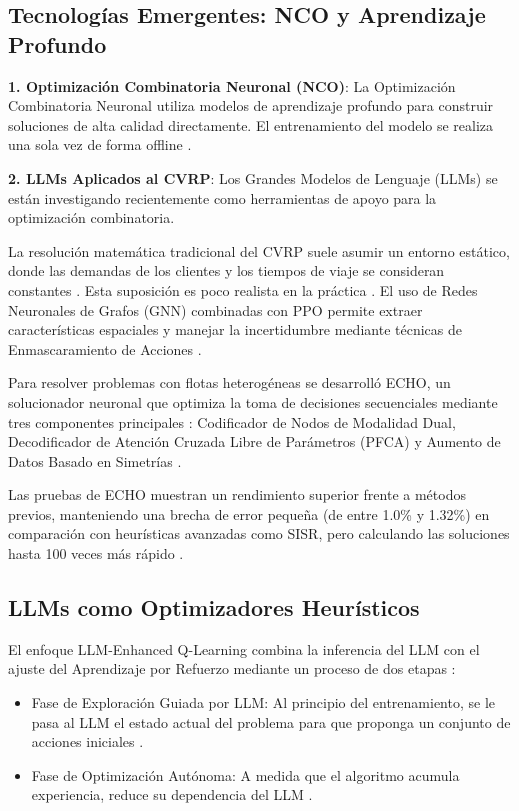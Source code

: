 \documentclass[a4paper, 11pt]{article}
\begin{document}
\subsection{Tecnologías Emergentes: NCO y Aprendizaje Profundo}

\textbf{1. Optimización Combinatoria Neuronal (NCO)}: La Optimización Combinatoria Neuronal utiliza modelos de aprendizaje profundo para construir soluciones de alta calidad directamente. El entrenamiento del modelo se realiza una sola vez de forma offline \cite{ref8}.

\textbf{2. LLMs Aplicados al CVRP}: Los Grandes Modelos de Lenguaje (LLMs) se están investigando recientemente como herramientas de apoyo para la optimización combinatoria. 

La resolución matemática tradicional del CVRP suele asumir un entorno estático, donde las demandas de los clientes y los tiempos de viaje se consideran constantes \cite{ref2}. Esta suposición es poco realista en la práctica \cite{ref3}. El uso de Redes Neuronales de Grafos (GNN) combinadas con PPO permite extraer características espaciales y manejar la incertidumbre mediante técnicas de Enmascaramiento de Acciones \cite{ref2}. 

Para resolver problemas con flotas heterogéneas se desarrolló ECHO, un solucionador neuronal que optimiza la toma de decisiones secuenciales mediante tres componentes principales \cite{ref1}: Codificador de Nodos de Modalidad Dual, Decodificador de Atención Cruzada Libre de Parámetros (PFCA) y Aumento de Datos Basado en Simetrías \cite{ref1}.

Las pruebas de ECHO muestran un rendimiento superior frente a métodos previos, manteniendo una brecha de error pequeña (de entre 1.0\% y 1.32\%) en comparación con heurísticas avanzadas como SISR, pero calculando las soluciones hasta 100 veces más rápido \cite{ref5,ref8}.

\subsection{LLMs como Optimizadores Heurísticos}

El enfoque LLM-Enhanced Q-Learning combina la inferencia del LLM con el ajuste del Aprendizaje por Refuerzo mediante un proceso de dos etapas \cite{ref1}:
\begin{itemize}
    \item Fase de Exploración Guiada por LLM: Al principio del entrenamiento, se le pasa al LLM el estado actual del problema para que proponga un conjunto de acciones iniciales \cite{ref9}. 
    \item Fase de Optimización Autónoma: A medida que el algoritmo acumula experiencia, reduce su dependencia del LLM \cite{ref1}.
\end{itemize}
\end{document}
